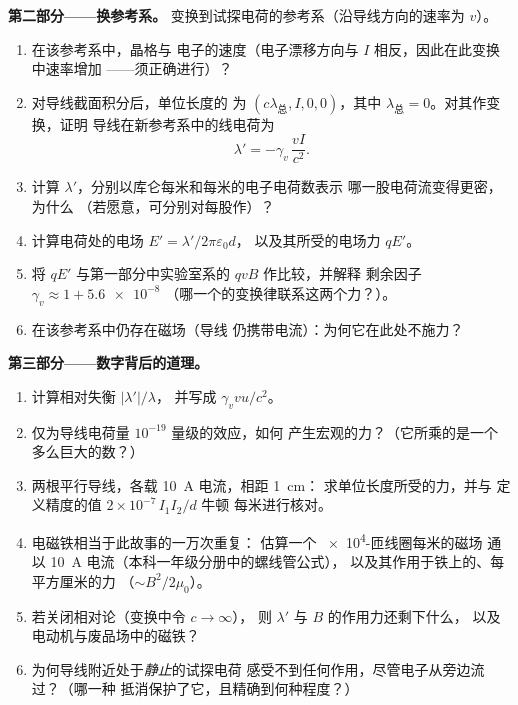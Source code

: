 \begin{problem}
\medskip\noindent\textbf{第二部分——换参考系。}
变换到试探电荷的参考系（沿导线方向的速率为 $v$）。
\begin{enumerate}[resume]
  \item 在该参考系中，晶格与
        电子的速度（电子漂移方向与 $I$ 相反，因此在此变换中速率增加
        ——须正确进行）？
  \item 对导线截面积分后，单位长度的
        为 $(c\lambda_{\text{总}}, I, 0, 0)$，其中
        $\lambda_{\text{总}} = 0$。对其作变换，证明
        导线在新参考系中的线电荷为
        \[
        \lambda' = -\gamma_v\,\frac{vI}{c^2} .
        \]
  \item 计算 $\lambda'$，分别以库仑每米和每米的电子电荷数表示
        哪一股电荷流变得更密，为什么
        （若愿意，可分别对每股作）？
  \item 计算电荷处的电场 $E' = \lambda'/2\pi\varepsilon_0d$，
        以及其所受的电场力 $qE'$。
  \item 将 $qE'$ 与第一部分中实验室系的 $qvB$ 作比较，并解释
        剩余因子 $\gamma_v \approx 1 + \num{5.6e-8}$
        （哪一个的变换律联系这两个力？）。
  \item 在该参考系中仍存在磁场（导线
        仍携带电流）：为何它在此处不施力？
\end{enumerate}

\medskip\noindent\textbf{第三部分——数字背后的道理。}
\begin{enumerate}[resume]
  \item 计算相对失衡 $|\lambda'|/\lambda$，
        并写成 $\gamma_v vu/c^2$。
  \item 仅为导线电荷量 $10^{-19}$ 量级的效应，如何
        产生宏观的力？（它所乘的是一个
        多么巨大的数？）
  \item 两根平行导线，各载 \qty{10}{A} 电流，相距 \qty{1}{cm}：
        求单位长度所受的力，并与
        定义精度的值 $2 \times 10^{-7}\,I_1I_2/d$ 牛顿
        每米进行核对。
  \item 电磁铁相当于此故事的一万次重复：
        估算一个 \qty{e4}{}-匝线圈每米的磁场
        通以 \qty{10}{A} 电流（本科一年级分册中的螺线管公式），
        以及其作用于铁上的、每平方厘米的力
        （$\sim B^2/2\mu_0$）。
  \item 若关闭相对论（变换中令 $c \to \infty$），
        则 $\lambda'$ 与 $B$ 的作用力还剩下什么，
        以及电动机与废品场中的磁铁？
  \item 为何导线附近处于\emph{静止}的试探电荷
        感受不到任何作用，尽管电子从旁边流过？（哪一种
        抵消保护了它，且精确到何种程度？）
\end{enumerate}


\end{problem}
